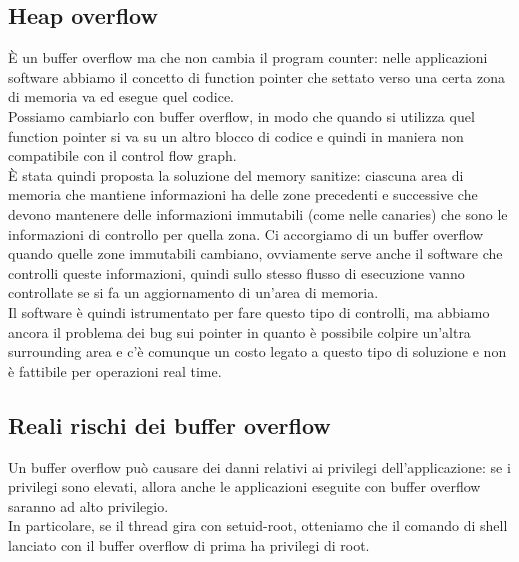 \documentclass[12pt, oneside]{extbook}
\begin{document}
\subsection{Heap overflow}
È un buffer overflow ma che non cambia il program counter: nelle applicazioni software abbiamo il concetto di function pointer che settato verso una certa zona di memoria va ed esegue quel codice.\\Possiamo cambiarlo con buffer overflow, in modo che quando si utilizza quel function pointer si va su un altro blocco di codice e quindi in maniera non compatibile con il control flow graph.\\È stata quindi proposta la soluzione del memory sanitize: ciascuna area di memoria che mantiene informazioni ha delle zone precedenti e successive che devono mantenere delle informazioni immutabili (come nelle canaries) che sono le informazioni di controllo per quella zona. Ci accorgiamo di un buffer overflow quando quelle zone immutabili cambiano, ovviamente serve anche il software che controlli queste informazioni, quindi sullo stesso flusso di esecuzione vanno controllate se si fa un aggiornamento di un'area di memoria.\\Il software è quindi istrumentato per fare questo tipo di controlli, ma abbiamo ancora il problema dei bug sui pointer in quanto è possibile colpire un'altra surrounding area e c'è comunque un costo legato a questo tipo di soluzione e non è fattibile per operazioni real time.
\subsection{Reali rischi dei buffer overflow}
Un buffer overflow può causare dei danni relativi ai privilegi dell'applicazione: se i privilegi sono elevati, allora anche le applicazioni eseguite con buffer overflow saranno ad alto privilegio.\\In particolare, se il thread gira con setuid-root, otteniamo che il comando di shell lanciato con il buffer overflow di prima ha privilegi di root.
\end{document}
